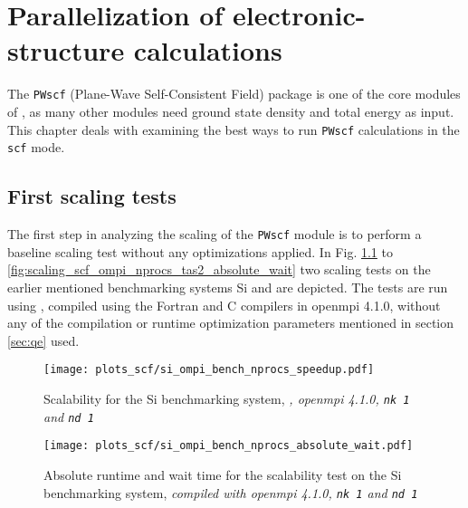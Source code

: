 \documentclass[main.tex]{subfiles}
\begin{document}
\chapter{Parallelization of electronic-structure calculations\label{ch:optimisation_scf}}

The \texttt{PWscf} (Plane-Wave Self-Consistent Field) package is one of the core modules of \QE, as many other modules need ground state density and total energy as input.
This chapter deals with examining the best ways to run \texttt{PWscf} calculations in the \texttt{scf} mode.

\section{First scaling tests}\label{sec:scf_first_scaling}

The first step in analyzing the scaling of the \texttt{PWscf} module is to perform a baseline scaling test without any optimizations applied. 
In Fig. \ref{fig:scaling_scf_ompi_nprocs_si_speedup} to \ref{fig:scaling_scf_ompi_nprocs_tas2_absolute_wait} two scaling tests on the earlier mentioned benchmarking systems Si and \TaS are depicted. 
The tests are run using , compiled using the Fortran and C compilers in \gls{openmpi} 4.1.0, without any of the compilation or runtime optimization parameters mentioned in section \ref{sec:qe} used.

\begin{figure}[ht!]
\centering
\texttt{[image: plots\_scf/si\_ompi\_bench\_nprocs\_speedup.pdf]}
\caption{Scalability for the Si benchmarking system, \emph{, \gls{openmpi} 4.1.0, \texttt{nk 1} and \texttt{nd 1}}}
\label{fig:scaling_scf_ompi_nprocs_si_speedup}
\end{figure}

\begin{figure}[ht!]
\centering
\texttt{[image: plots\_scf/si\_ompi\_bench\_nprocs\_absolute\_wait.pdf]}
\caption{Absolute runtime and wait time for the scalability test on the Si benchmarking system, \emph{\QE compiled with \gls{openmpi} 4.1.0, \texttt{nk 1} and \texttt{nd 1}}}
\label{fig:scaling_scf_ompi_nprocs_si_absolute_wait}
\end{figure}
\end{document}
